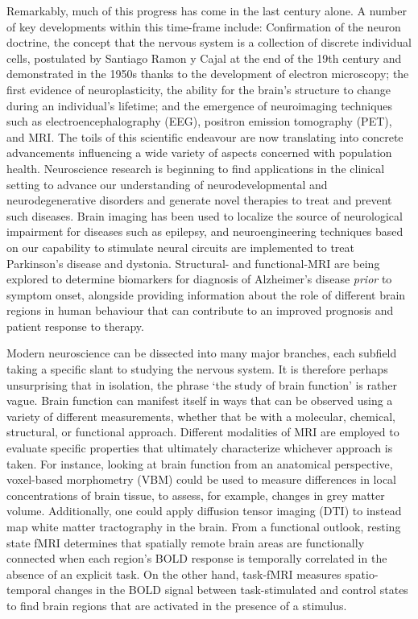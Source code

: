 Remarkably, much of this progress has come in the last century alone. A number of key developments within this time-frame include: Confirmation of the neuron doctrine, the concept that the nervous system is a collection of discrete individual cells, postulated by Santiago Ramon y Cajal at the end of the 19th century and demonstrated in the 1950s thanks to the development of electron microscopy; the first evidence of neuroplasticity, the ability for the brain's structure to change during an individual's lifetime; and the emergence of neuroimaging techniques such as electroencephalography (EEG), positron emission tomography (PET), and MRI. The toils of this scientific endeavour are now translating into concrete advancements influencing a wide variety of aspects concerned with population health. Neuroscience research is beginning to find applications in the clinical setting to advance our understanding of neurodevelopmental and neurodegenerative disorders and generate novel therapies to treat and prevent such diseases. Brain imaging has been used to localize the source of neurological impairment for diseases such as epilepsy, and neuroengineering techniques based on our capability to stimulate neural circuits are implemented to treat Parkinson's disease and dystonia. Structural- and functional-MRI are being explored to determine biomarkers for diagnosis of Alzheimer's disease \textit{prior} to symptom onset, alongside providing information about the role of different brain regions in human behaviour that can contribute to an improved prognosis and patient response to therapy.  

Modern neuroscience can be dissected into many major branches, each subfield taking a specific slant to studying the nervous system. It is therefore perhaps unsurprising that in isolation, the phrase `the study of brain function' is rather vague. Brain function can manifest itself in ways that can be observed using a variety of different measurements, whether that be with a molecular, chemical, structural, or functional approach. Different modalities of MRI are employed to evaluate specific properties that ultimately characterize whichever approach is taken. For instance, looking at brain function from an anatomical perspective, voxel-based morphometry (VBM) could be used to measure differences in local concentrations of brain tissue, to assess, for example, changes in grey matter volume. Additionally, one could apply diffusion tensor imaging (DTI) to instead map white matter tractography in the brain. From a functional outlook, resting state fMRI determines that spatially remote brain areas are functionally connected when each region's BOLD response is temporally correlated in the absence of an explicit task. On the other hand, task-fMRI measures spatio-temporal changes in the BOLD signal between task-stimulated and control states to find brain regions that are activated in the presence of a stimulus. 

